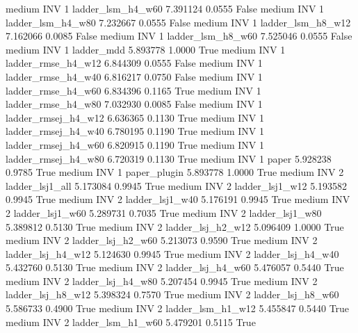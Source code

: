     medium      INV                 1   ladder_lsm_h4_w60   7.391124      0.0555   False
    medium      INV                 1   ladder_lsm_h4_w80   7.232667      0.0555   False
    medium      INV                 1   ladder_lsm_h8_w12   7.162066      0.0085   False
    medium      INV                 1   ladder_lsm_h8_w60   7.525046      0.0555   False
    medium      INV                 1          ladder_mdd   5.893778      1.0000    True
    medium      INV                 1  ladder_rmse_h4_w12   6.844309      0.0555   False
    medium      INV                 1  ladder_rmse_h4_w40   6.816217      0.0750   False
    medium      INV                 1  ladder_rmse_h4_w60   6.834396      0.1165    True
    medium      INV                 1  ladder_rmse_h4_w80   7.032930      0.0085   False
    medium      INV                 1 ladder_rmsej_h4_w12   6.636365      0.1130    True
    medium      INV                 1 ladder_rmsej_h4_w40   6.780195      0.1190    True
    medium      INV                 1 ladder_rmsej_h4_w60   6.820915      0.1190    True
    medium      INV                 1 ladder_rmsej_h4_w80   6.720319      0.1130    True
    medium      INV                 1               paper   5.928238      0.9785    True
    medium      INV                 1        paper_plugin   5.893778      1.0000    True
    medium      INV                 2     ladder_lsj1_all   5.173084      0.9945    True
    medium      INV                 2     ladder_lsj1_w12   5.193582      0.9945    True
    medium      INV                 2     ladder_lsj1_w40   5.176191      0.9945    True
    medium      INV                 2     ladder_lsj1_w60   5.289731      0.7035    True
    medium      INV                 2     ladder_lsj1_w80   5.389812      0.5130    True
    medium      INV                 2   ladder_lsj_h2_w12   5.096409      1.0000    True
    medium      INV                 2   ladder_lsj_h2_w60   5.213073      0.9590    True
    medium      INV                 2   ladder_lsj_h4_w12   5.124630      0.9945    True
    medium      INV                 2   ladder_lsj_h4_w40   5.432760      0.5130    True
    medium      INV                 2   ladder_lsj_h4_w60   5.476057      0.5440    True
    medium      INV                 2   ladder_lsj_h4_w80   5.207454      0.9945    True
    medium      INV                 2   ladder_lsj_h8_w12   5.398324      0.7570    True
    medium      INV                 2   ladder_lsj_h8_w60   5.586733      0.4900    True
    medium      INV                 2   ladder_lsm_h1_w12   5.455847      0.5440    True
    medium      INV                 2   ladder_lsm_h1_w60   5.479201      0.5115    True
